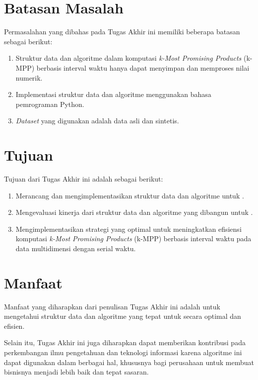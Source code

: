 \section{Batasan Masalah}
\tab Permasalahan yang dibahas pada Tugas Akhir ini memiliki beberapa batasan sebagai berikut:
\begin{enumerate}
	\item Struktur data dan algoritme dalam komputasi \textit{k-Most Promising Products} (k-MPP) berbasis interval waktu hanya dapat menyimpan dan memproses nilai numerik.
	\item Implementasi struktur data dan algoritme menggunakan bahasa pemrograman Python.
	\item \textit{Dataset} yang digunakan adalah data asli dan sintetis.
\end{enumerate}

\section{Tujuan}
\tab Tujuan dari Tugas Akhir ini adalah sebagai berikut:

\begin{enumerate}
	\item Merancang dan mengimplementasikan struktur data dan algoritme untuk \problem.
	\item Mengevaluasi kinerja dari struktur data dan algoritme yang dibangun untuk \problem.
	\pagebreak
	\item Mengimplementasikan strategi yang optimal untuk meningkatkan efisiensi komputasi \textit{k-Most Promising Products} (k-MPP) berbasis interval waktu pada data multidimensi dengan serial waktu.
\end{enumerate}

\section{Manfaat}
\tab Manfaat yang diharapkan dari penulisan Tugas Akhir ini adalah untuk mengetahui struktur data dan algoritme yang tepat untuk \problem secara optimal dan efisien.

Selain itu, Tugas Akhir ini juga diharapkan dapat memberikan kontribusi pada perkembangan ilmu pengetahuan dan teknologi informasi karena algoritme ini dapat digunakan dalam berbagai hal, khususnya bagi perusahaan untuk membuat bisnisnya menjadi lebih baik dan tepat sasaran.

